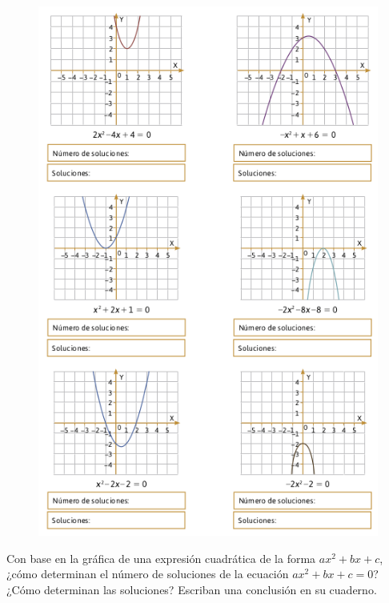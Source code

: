 \documentclass[11pt]{book}
\begin{document}
\begin{enumerate}
        \begin{figure}[H]
          \centering
          \includegraphics[width=0.8\linewidth]{paraboles2.6.png}
          \label{fig:paraboles2.6}
        \end{figure}

        Con base en la gráfica de una expresión cuadrática de
        la forma $ax^2 + bx + c$, ¿cómo determinan el número de soluciones de la
        ecuación $ax^2 + bx + c = 0$? ¿Cómo determinan las soluciones? Escriban
        una conclusión en su cuaderno.
\end{enumerate}
\end{document}
